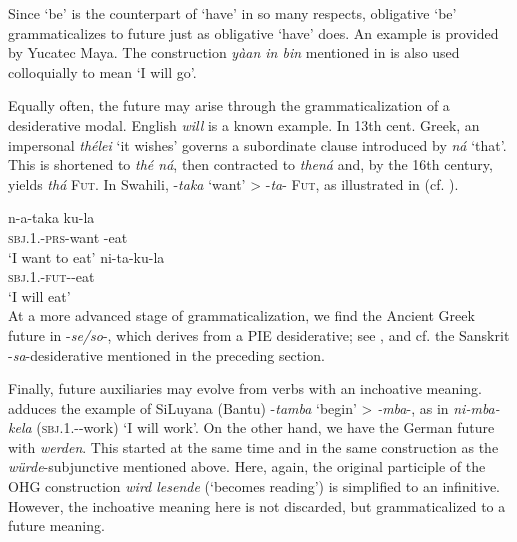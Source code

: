 Since ‘be’ is the counterpart of ‘have’ in so many respects, obligative ‘be’ grammaticalizes to future just as obligative ‘have’ does. An example is provided by Yucatec Maya. The construction \textit{yàan in bin} mentioned in  is also used colloquially to mean ‘I will go’.

Equally often, the future may arise through the grammaticalization of a desiderative modal. English \textit{will} is a known example. In 13th cent. Greek, an impersonal \textit{thélei} ‘it wishes’ governs a subordinate clause introduced by \textit{ná} ‘that’. This is shortened to \textit{thé ná}, then contracted to \textit{thená} and, by the 16th century, yields \textit{thá} \textsc{Fut}. In Swahili, -\textit{taka} ‘want’ {\textgreater} -\textit{ta}{}- \textsc{Fut}, as illustrated in  (cf. \citealt[131]{HeineEtAl1984}).

\setcounter{equation}{1}
\ea\label{ex:E2}
 \ea
 \gll n-a-taka ku-la \\   
 \textsc{sbj}.1.\glsg-\textsc{prs}-want  \glinf-eat  \\
\glt ‘I want to eat’
 \ex
 \gll ni-ta-ku-la \\
 \textsc{sbj}.1.\glsg-\textsc{fut}-\glinf-eat\\
 \glt ‘I will eat’ \\
\z
\z
\noindent At a more advanced stage of grammaticalization, we find the Ancient Greek future in -\textit{se/so}{}-, which derives from a PIE desiderative; see \citet[224f]{Rix1976}, and cf. the Sanskrit -\textit{sa}{}-desiderative mentioned in the preceding section.

Finally, future auxiliaries may evolve from verbs with an inchoative meaning. \citet[917]{Givón1973} adduces the example of SiLuyana (Bantu) -\textit{tamba} ‘begin’ {\textgreater} \mbox{\textit{-mba}}-\scfut, as in \textit{ni-mba-kela} (\textsc{sbj}.1.\glsg{}-\scfut-work) ‘I will work’. On the other hand, we have the German future with \textit{werden}. This started at the same time and in the same construction as the \textit{würde}{}-subjunctive mentioned above. Here, again, the original participle of the OHG construction \textit{wird lesende} (‘becomes reading’) is simplified to an infinitive. However, the inchoative meaning here is not discarded, but grammaticalized to a future meaning.

